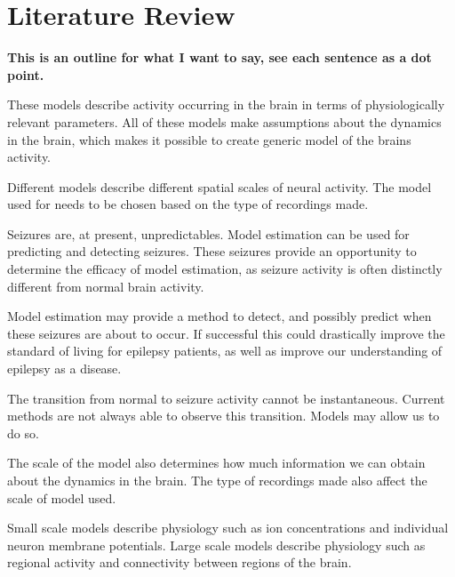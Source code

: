 \section{Literature Review}

\textbf{This is an outline for what I want to say, see each sentence as a dot point.}

	These models describe activity occurring in the brain in terms of physiologically relevant parameters.
	All of these models make assumptions about the dynamics in the brain, which makes it possible to create  generic model of the brains activity.

	Different models describe different spatial scales of neural activity.
	The model used for needs to be chosen based on the type of recordings made.

	Seizures are, at present, unpredictables.
	Model estimation can be used for predicting and detecting seizures.
	These seizures provide an opportunity to determine the efficacy of model estimation, as seizure activity is often distinctly different from normal brain activity.
	

	Model estimation may provide a method to detect, and possibly predict when these seizures are about to occur.
	If successful this could drastically improve the standard of living for epilepsy patients, as well as improve our understanding of epilepsy as a disease.
	
	The transition from normal to seizure activity cannot be instantaneous.
	Current methods are not always able to observe this transition.
	Models may allow us to do so.

	The scale of the model also determines how much information we can obtain about the dynamics in the brain. 
	The type of recordings made also affect the scale of model used. 

	Small scale models describe physiology such as ion concentrations and individual neuron membrane potentials.
	Large scale models describe physiology such as regional activity and connectivity between regions of the brain.

